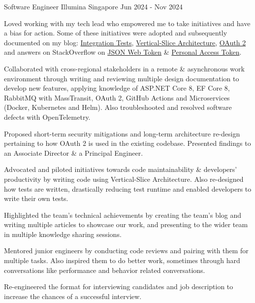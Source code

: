 \begin{cventries}
\cventry
{Software Engineer} %
{Illumina} %
{Singapore} %
{Jun 2024 - Nov 2024} %
{
  \begin{cvitems} %
    \item {Loved working with my tech lead who empowered me to take initiatives and have a bias for action. Some of these initiatives were adopted and subsequently documented on my blog: \href{https://bit.ly/zy-tests}{Integration Tests}, \href{https://bit.ly/zy-vsa}{Vertical-Slice Architecture}, \href{https://bit.ly/zy-oauth2}{OAuth 2} and answers on StackOverflow on \href{https://bit.ly/zy-jwt}{JSON Web Token} \& \href{https://bit.ly/zy-pat}{Personal Access Token}.}
    \item {Collaborated with cross-regional stakeholders in a remote \& asynchronous work environment through writing and reviewing multiple design documentation to develop new features, applying knowledge of ASP.NET Core 8, EF Core 8, RabbitMQ with MassTransit, OAuth 2, GitHub Actions and Microservices (Docker, Kubernetes and Helm). Also troubleshooted and resolved software defects with OpenTelemetry.}
    \item {Proposed short-term security mitigations and long-term architecture re-design pertaining to how OAuth 2 is used in the existing codebase. Presented findings to an Associate Director \& a Principal Engineer.}
    \item {Advocated and piloted initiatives towards code maintainability \& developers' productivity by writing code using Vertical-Slice Architecture. Also re-designed how tests are written, drastically reducing test runtime and enabled developers to write their own tests.}
    \item {Highlighted the team's technical achievements by creating the team's blog and writing multiple articles to showcase our work, and presenting to the wider team in multiple knowledge sharing sessions.}
    \item {Mentored junior engineers by conducting code reviews and pairing with them for multiple tasks. Also inspired them to do better work, sometimes through hard conversations like performance and behavior related conversations.}
    \item {Re-engineered the format for interviewing candidates and job description to increase the chances of a successful interview.}
  \end{cvitems}
}


\end{cventries}

